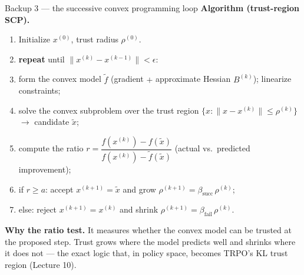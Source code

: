 \documentclass[10pt, aspectratio=169]{beamer}
\begin{document}
\begin{frame}{Backup 3 --- the successive convex programming loop}
\footnotesize
\textbf{Algorithm (trust-region SCP).}
\begin{enumerate}\setlength\itemsep{1pt}
\item Initialize $x^{(0)}$, trust radius $\rho^{(0)}$.
\item \textbf{repeat} until $\|x^{(k)} - x^{(k-1)}\| < \epsilon$:
\item \quad form the convex model $\tilde f$ (gradient $+$ approximate Hessian $B^{(k)}$); linearize constraints;
\item \quad solve the convex subproblem over the trust region $\{x: \|x-x^{(k)}\|\le\rho^{(k)}\}$ $\to$ candidate $\tilde x$;
\item \quad compute the ratio $r = \dfrac{f(x^{(k)}) - f(\tilde x)}{f(x^{(k)}) - \tilde f(\tilde x)}$ (actual vs.\ predicted improvement);
\item \quad if $r \ge a$: accept $x^{(k+1)} = \tilde x$ and grow $\rho^{(k+1)} = \beta_{\text{succ}}\,\rho^{(k)}$;
\item \quad else: reject $x^{(k+1)} = x^{(k)}$ and shrink $\rho^{(k+1)} = \beta_{\text{fail}}\,\rho^{(k)}$.
\end{enumerate}
\medskip
\textbf{Why the ratio test.} It measures whether the convex model can be trusted at the proposed step. Trust grows where the model predicts well and shrinks where it does not --- the exact logic that, in policy space, becomes TRPO's KL trust region (Lecture 10).
\end{frame}
\end{document}
